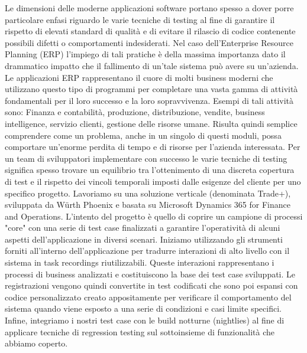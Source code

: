 Le dimensioni delle moderne applicazioni software portano spesso a dover porre particolare enfasi riguardo le varie tecniche di testing al fine di garantire il rispetto di elevati standard di qualità e di evitare il rilascio di codice contenente possibili difetti o comportamenti indesiderati. 
Nel caso dell'Enterprise Resource Planning (ERP) l'impiego di tali pratiche è della massima importanza dato il drammatico impatto che il fallimento di un'tale sistema può avere su un'azienda. 
Le applicazioni ERP rappresentano il cuore di molti business moderni che utilizzano questo tipo di programmi per completare una vasta gamma di attività fondamentali per il loro successo e la loro sopravvivenza. 
Esempi di tali attività sono: Finanza e contabilità, produzione, distribuzione, vendite, business intelligence, servizio clienti, gestione delle risorse umane. 
Risulta quindi semplice comprendere come un problema, anche in un singolo di questi moduli, possa comportare un'enorme perdita di tempo e di risorse per l'azienda interessata. 
Per un team di sviluppatori implementare con successo le varie tecniche di testing significa spesso trovare un equilibrio tra l'ottenimento di una discreta copertura di test e il rispetto dei vincoli temporali imposti dalle esigenze del cliente per uno specifico progetto. 
Lavoriamo su una soluzione verticale (denominata Trade+), sviluppata da Würth Phoenix e basata su Microsoft Dynamics 365 for Finance and Operations. L'intento del progetto è quello di coprire un campione di processi "core" con una serie di test case finalizzati a garantire l'operatività di alcuni aspetti dell'applicazione in diversi scenari. 
Iniziamo utilizzando gli strumenti forniti all'interno dell'applicazione per tradurre interazioni di alto livello con il sistema in task recordings riutilizzabili. 
Queste interazioni rappresentano i processi di business analizzati e costituiscono la base dei test case sviluppati. 
Le registrazioni vengono quindi convertite in test codificati che sono poi espansi con codice personalizzato creato appositamente per verificare il comportamento del sistema quando viene esposto a una serie di condizioni e casi limite specifici. 
Infine, integriamo i nostri test case con le build notturne (nightlies) al fine di applicare tecniche di regression testing sul sottoinsieme di funzionalità che abbiamo coperto. 

